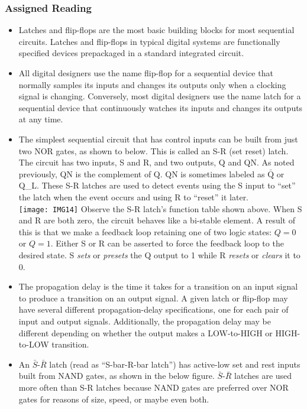 \documentclass[10pt,a4paper]{article}
\begin{document}
\subsubsection{Assigned Reading}
\begin{itemize}
\item Latches and flip-flops are the most basic building blocks for most sequential circuits. Latches and flip-flops in typical digital systems are functionally specified devices prepackaged in a standard integrated circuit. 
\item All digital designers use the name flip-flop for a sequential device that normally samples its inputs and changes its outputs only when a clocking signal is changing. Conversely, most digital designers use the name latch for a sequential device that continuously watches its inputs and changes its outputs at any time.
\item The simplest sequential circuit that has control inputs can be built from just two NOR gates, as shown to below. This is called an S-R (set reset) latch. The circuit has two inputs, S and R, and two outputs, Q and QN. As noted previously, QN is the complement of Q. QN is sometimes labeled as $\bar{\text{Q}}$ or Q\_L. These S-R latches are used to detect events using the S input to ``set'' the latch when the event occurs and using R to ``reset'' it later.\\
\texttt{[image: IMG14]}
Observe the S-R latch's function table shown above. When S and R are both zero, the circuit behaves like a bi-stable element. A result of this is that we make a feedback loop retaining one of two logic states: $Q=0$ or $Q=1$. Either S or R can be asserted to force the feedback loop to the desired state. S \textit{sets} or \textit{presets} the Q output to 1 while R \textit{resets} or \textit{clears} it to 0. 
\item The propagation delay is the time it takes for a transition on an input signal to produce a transition on an output signal. A given latch or flip-flop may have several different propagation-delay specifications, one for each pair of input and output signals. Additionally, the propagation delay may be different depending on whether the output makes a LOW-to-HIGH or HIGH-to-LOW transition. 
\item An $\bar{S}$-$\bar{R}$ latch (read as ``S-bar-R-bar latch'') has active-low set and rest inputs built from NAND gates, as shown in the below figure. $\bar{S}$-$\bar{R}$ latches are used more often than S-R latches because NAND gates are preferred over NOR gates for reasons of size, speed, or maybe even both.\\

\end{itemize}
\end{document}
